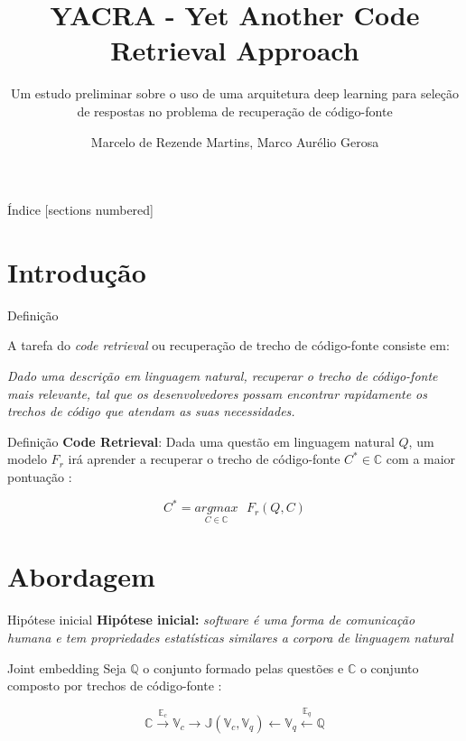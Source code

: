 \documentclass[10pt]{beamer}
\title{YACRA - Yet Another Code Retrieval Approach}
\subtitle{Um estudo preliminar sobre o uso de uma arquitetura deep learning para seleção de respostas no problema de recuperação de código-fonte}
\date{}
\author{Marcelo de Rezende Martins\inst{1}, Marco Aurélio Gerosa\inst{2}}
\institute{\inst{1}Instituto de Pesquisas Tecnológicas
  (IPT) \and \inst{2}Northern Arizona University (NAU)}
\begin{document}
\maketitle

\begin{frame}{Índice}
  [sections numbered]
  \tableofcontents%
\end{frame}

\section[Introdução]{Introdução}

\begin{frame}[fragile]{Definição}

A tarefa do \textit{code retrieval} ou recuperação de trecho de código-fonte consiste em:
 
\emph{Dado uma descrição em linguagem natural, recuperar o trecho de código-fonte mais relevante, tal que os desenvolvedores possam encontrar rapidamente os trechos de código que atendam as suas necessidades. \cite{Chen-bi-variational-autoencoder:2018}}
 
\end{frame}
\begin{frame}[fragile]{Definição}
  \textbf{Code Retrieval}: Dada uma questão em linguagem natural $Q$, um modelo $F_{r}$ irá aprender a recuperar o trecho de código-fonte $C^{*} \in \mathbb{C}$ com a maior pontuação \cite{yao-2018}:

\begin{equation}\label{eq:code-retrieval}
C^{*} = \underset{C \in \mathbb{C}}{argmax}\text{ } F_{r}(Q , C)
\end{equation}
  
\end{frame}

\section{Abordagem}

\begin{frame}{Hipótese inicial}
	\textbf{Hipótese inicial:} \emph{software é uma forma de comunicação humana e tem propriedades estatísticas similares a corpora de linguagem natural \cite{Allamanis:2018:SML}}
\end{frame}

\begin{frame}{Joint embedding}
	Seja $\mathbb{Q}$ o conjunto formado pelas questões e $\mathbb{C}$ o conjunto composto por trechos de código-fonte \cite{Gu-deep-code-search:2018}:
	
    \begin{equation}
        \mathbb{C} \xrightarrow{\mathbb{E}_{c}} \mathbb{V}_{c} \rightarrow \mathbb{J}(\mathbb{V}_{c}, \mathbb{V}_{q}) \leftarrow \mathbb{V}_{q} \xleftarrow{\mathbb{E}_{q}} \mathbb{Q}
    \end{equation}
\end{frame}
\end{document}
